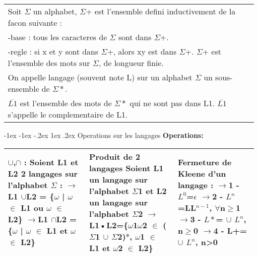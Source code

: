 \documentclass[5pt]{article}
\makeatletter
\renewcommand{\subsubsection}{\@startsection {section}{1}{\z@}%
             {-1ex \@plus -1ex \@minus -.2ex}%
             {1ex \@plus.2ex}%
             {\normalfont\scriptsize\sffamily\bfseries}}
\makeatother
\begin{document}
\begin{scriptsize}
\begin{tabularx}{\linewidth}{|Y|Y|}
Soit $\Sigma$ un alphabet, $\Sigma$+ est l’ensemble defini inductivement de la facon suivante :\\
-base : tous les caracteres de $\Sigma$ sont dans $\Sigma$+.\\
-regle : si x et y sont dans $\Sigma$+, alors xy est dans $\Sigma$+. $\Sigma$+ est l'ensemble des mots sur $\Sigma$, de longueur finie.&\\\hline
On appelle langage (souvent note L) sur un alphabet $\Sigma$ un sous-ensemble de $\Sigma*$.&\\\hline
$\overline{L1}$ est l'ensemble des mots de $\Sigma*$ qui ne sont pas dans L1.
$\overline{L1}$ s'appelle le complementaire de L1.&\\\hline
\end{tabularx} 
\subsubsection{Operations sur les langages}
\textbf{Operations:}  \\
\noindent
\begin{tabularx}{\linewidth}{|Y|Y|Y|}
\hline
$\cup$,$\cap$ :
Soient L1 et L2 2 langages sur l’alphabet $\Sigma$ :
$\rightarrow$L1 $\cup$L2 = \{$\omega$ | $\omega$ $\in$ L1 ou $\omega$ $\in$ L2\}
$\rightarrow$L1 $\cap$L2 = \{$\omega$ | $\omega$ $\in$ L1 et $\omega$ $\in$ L2\}
&
Produit de 2 langages
Soient L1 un langage sur l'alphabet $\Sigma$1
et L2 un langage sur l'alphabet $\Sigma$2
$\rightarrow$L1•L2=\{$\omega$1$\omega$2 $\in$ ($\Sigma$1 $\cup$ $\Sigma$2)$\ast$, $\omega$1 $\in$ L1 et $\omega$2 $\in$ L2\}
&
Fermeture de Kleene d’un langage :
$\rightarrow$1 - $L^{0}$={$\epsilon$}
$\rightarrow$2 - $L^{n}$=LL$^{n-1}$, $\forall$n$\geq$1
$\rightarrow$3 - $L\ast$= $\cup$ $L^{n}$, n$\geq$0
$\rightarrow$4 - L+=$\cup$ $L^{n}$, n>0
\\ \hline
\end{tabularx} 

\end{scriptsize}
\end{document}
